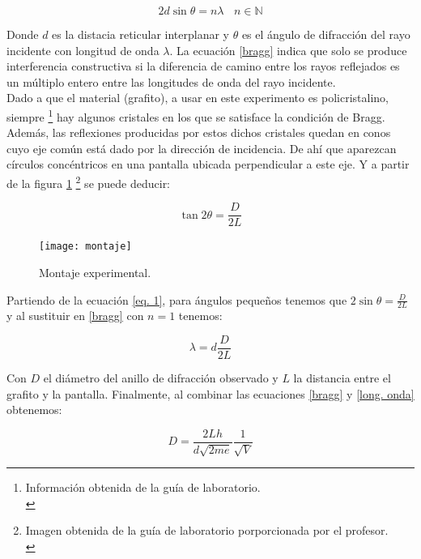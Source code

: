 \documentclass[prb,aps,twocolumn,preprintnumbers,amsmath,amssymb]{revtex4}
\begin{document}
\begin{equation}
\label{bragg}
2 d \sin \theta = n \lambda \ \ \ \ n \in \mathbb{N}
\end{equation}

Donde $d$ es la distacia reticular interplanar y $\theta$ es el ángulo de difracción del rayo incidente con longitud de onda $\lambda$. La ecuación \eqref{bragg} indica que solo se produce interferencia constructiva si la diferencia de camino entre los rayos reflejados es un múltiplo entero entre las longitudes de onda del rayo incidente.\\

Dado a que el material (grafito), a usar en este experimento es policristalino, siempre \footnote{Información obtenida de la guía de laboratorio.\\} hay algunos cristales en los que se satisface la condición de Bragg. Además, las reflexiones producidas por estos dichos cristales quedan en conos cuyo eje común está dado por la dirección de incidencia. De ahí que aparezcan círculos concéntricos en una pantalla ubicada perpendicular a este eje. Y a partir de la figura \ref{fig: montaje} \footnote{Imagen obtenida de la guía de laboratorio porporcionada por el profesor.\\} se puede deducir:

\begin{equation}
\label{eq. 1}
\tan 2\theta = \frac{D}{2L}
\end{equation}

\begin{figure}[h!]
	\centering
	\texttt{[image: montaje]}
	\caption{ Montaje experimental. }
	\label{fig: montaje}
\end{figure}

Partiendo de la ecuación \eqref{eq. 1}, para ángulos pequeños tenemos que $2 \sin \theta =\frac{D}{2L}$ y al sustituir en \eqref{bragg} con $n = 1$ tenemos:

\begin{equation}
\label{long. onda}
\lambda = d\frac{D}{2L}
\end{equation}

Con $D$ el diámetro del anillo de difracción observado y $L$ la distancia entre el grafito y la pantalla. Finalmente, al combinar las ecuaciones \eqref{bragg} y \eqref{long. onda} obtenemos:

\begin{equation}
\label{diametro}
D = \frac{2Lh}{d\sqrt{2me}} \frac{1}{\sqrt{V}}
\end{equation}
\end{document}
